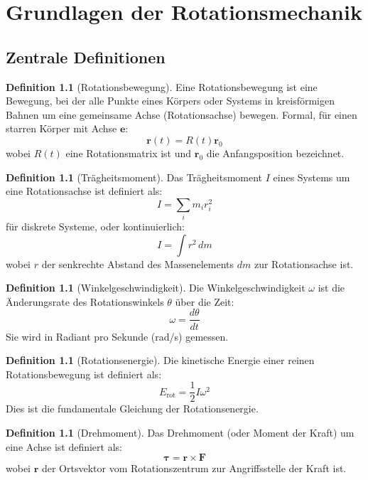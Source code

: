 \documentclass[12pt,a4paper]{report}
\theoremstyle{plain}
\theoremstyle{definition}
\newtheorem{definition}[theorem]{Definition}
\theoremstyle{remark}
\begin{document}
\chapter{Grundlagen der Rotationsmechanik}

\section{Zentrale Definitionen}

\begin{definition}[Rotationsbewegung]
	Eine Rotationsbewegung ist eine Bewegung, bei der alle Punkte eines Körpers oder Systems in kreisförmigen Bahnen um eine gemeinsame Achse (Rotationsachse) bewegen. Formal, für einen starren Körper mit Achse $\mathbf{e}$:
	\[
	\mathbf{r}(t) = R(t) \mathbf{r}_0
	\]
	wobei $R(t)$ eine Rotationsmatrix ist und $\mathbf{r}_0$ die Anfangsposition bezeichnet.
\end{definition}

\begin{definition}[Trägheitsmoment]
	Das Trägheitsmoment $I$ eines Systems um eine Rotationsachse ist definiert als:
	\[
	I = \sum_i m_i r_i^2
	\]
	für diskrete Systeme, oder kontinuierlich:
	\[
	I = \int r^2 \, dm
	\]
	wobei $r$ der senkrechte Abstand des Massenelements $dm$ zur Rotationsachse ist.
\end{definition}

\begin{definition}[Winkelgeschwindigkeit]
	Die Winkelgeschwindigkeit $\omega$ ist die Änderungsrate des Rotationswinkels $\theta$ über die Zeit:
	\[
	\omega = \frac{d\theta}{dt}
	\]
	Sie wird in Radiant pro Sekunde (rad/s) gemessen.
\end{definition}

\begin{definition}[Rotationsenergie]
	Die kinetische Energie einer reinen Rotationsbewegung ist definiert als:
	\[
	E_{\text{rot}} = \frac{1}{2} I \omega^2
	\]
	Dies ist die fundamentale Gleichung der Rotationsenergie.
\end{definition}

\begin{definition}[Drehmoment]
	Das Drehmoment (oder Moment der Kraft) um eine Achse ist definiert als:
	\[
	\boldsymbol{\tau} = \mathbf{r} \times \mathbf{F}
	\]
	wobei $\mathbf{r}$ der Ortsvektor vom Rotationszentrum zur Angriffsstelle der Kraft ist.
\end{definition}
\end{document}
